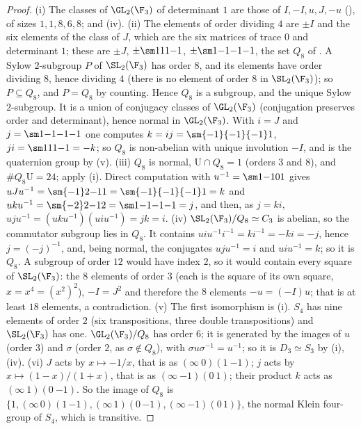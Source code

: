 \begin{proof}
(i) The classes of $\GL_2(\F_3)$ of determinant $1$ are those of $I,-I,u,J,-u$ (), of sizes $1,1,8,6,8$; and (iv).
(ii) The elements of order dividing $4$ are $\pm I$ and the six elements of the class of $J$, which are the six matrices of trace $0$ and determinant $1$; these are
$\pm J$, $\pm\sm111{-1}$, $\pm\sm1{-1}{-1}{-1}$, the set $Q_8$ of . A Sylow $2$-subgroup $P$ of $\SL_2(\F_3)$ has order $8$, and its elements
have order dividing $8$, hence dividing $4$ (there is no element of order $8$ in $\SL_2(\F_3)$); so $P\subseteq Q_8$, and $P=Q_8$ by counting. Hence $Q_8$ is a subgroup, and the
unique Sylow $2$-subgroup. It is a union of conjugacy classes of $\GL_2(\F_3)$ (conjugation preserves order and determinant), hence normal in $\GL_2(\F_3)$. With
$i=J$ and $j=\sm1{-1}{-1}{-1}$ one computes $k=ij=\sm{-1}{-1}{-1}1$, $ji=\sm111{-1}=-k$; so $Q_8$ is non-abelian with unique involution $-I$, and is the quaternion group by
(v). (iii) $Q_8$ is normal, $\mathrm U\cap Q_8=1$ (orders $3$ and $8$), and $\#Q_8\mathrm U=24$; apply (i). Direct
computation with $u^{-1}=\sm1{-1}01$ gives $uJu^{-1}=\sm{-1}2{-1}1=\sm{-1}{-1}{-1}1=k$ and $uku^{-1}=\sm{-2}2{-1}2=\sm1{-1}{-1}{-1}=j$, and then, as $j=ki$,
$uju^{-1}=(uku^{-1})(uiu^{-1})=jk=i$.
(iv) $\SL_2(\F_3)/Q_8\simeq C_3$ is abelian, so the commutator subgroup lies in $Q_8$. It contains $uiu^{-1}i^{-1}=ki^{-1}=-ki=-j$, hence $j=(-j)^{-1}$, and,
being normal, the conjugates $uju^{-1}=i$ and $uiu^{-1}=k$; so it is $Q_8$. A subgroup of order $12$ would have index $2$, so it would contain every square of $\SL_2(\F_3)$: the $8$ elements of order $3$
(each is the square of its own square, $x=x^4=(x^2)^2$), $-I=J^2$ and therefore the $8$ elements $-u=(-I)u$; that is at least $18$ elements, a contradiction.
(v) The first isomorphism is (i). $S_4$ has nine elements of order $2$ (six transpositions, three double transpositions) and
$\SL_2(\F_3)$ has one. $\GL_2(\F_3)/Q_8$ has order $6$; it is generated by the images of $u$ (order $3$) and $\sigma$ (order $2$, as $\sigma\notin Q_8$), with
$\sigma u\sigma^{-1}=u^{-1}$; so it is $D_3\simeq S_3$ by (i),(iv). (vi) $J$ acts by $x\mapsto-1/x$, that is as $(\infty\ 0)(1\ {-1})$; $j$ acts by
$x\mapsto(1-x)/(1+x)$, that is as $(\infty\ {-1})(0\ 1)$; their product $k$ acts as $(\infty\ 1)(0\ {-1})$. So the image of $Q_8$ is
$\{1,(\infty\,0)(1\,{-1}),(\infty\,1)(0\,{-1}),(\infty\,{-1})(0\,1)\}$, the normal Klein four-group of $S_4$, which is transitive.
\end{proof}

